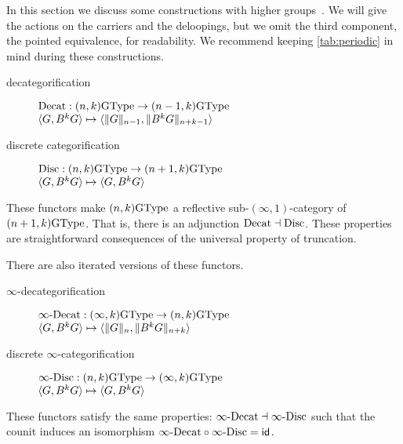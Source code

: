 In this section we discuss some constructions with higher groups~\cite{BaezDolan1998}. We will give the actions on the carriers and the deloopings, but we omit the third component, the pointed equivalence, for readability. We recommend keeping \cref{tab:periodic} in mind during these constructions.
\begin{description}
\item[decategorification] $\Decat : (n,k)\GType \to (n-1,k)\GType$\\
  $\angled{G,B^kG} \mapsto \angled{\trunc{n-1}{G}, \trunc{n+k-1}{B^kG}}$
\item[discrete categorification] $\Disc : (n,k)\GType \to (n+1,k)\GType$ \\
  $\angled{G,B^kG} \mapsto \angled{G,B^kG}$
\end{description}
These functors make $(n,k)\GType$ a reflective sub-$(\infty,1)$-category of $(n+1,k)\GType$. That is, there is an adjunction ${\Decat} \dashv {\Disc}$. These properties are straightforward consequences of the universal property of truncation.

There are also iterated versions of these functors.
\begin{description}
  \item[$\infty$-decategorification] $\iDecat : (\infty,k)\GType \to (n,k)\GType$\\
    $\angled{G,B^kG} \mapsto \angled{\trunc{n}{G}, \trunc{n+k}{B^kG}}$
  \item[discrete $\infty$-categorification] $\iDisc : (n,k)\GType \to (\infty,k)\GType$ \\
    $\angled{G,B^kG} \mapsto \angled{G,B^kG}$
\end{description}
These functors satisfy the same properties: ${\iDecat} \dashv {\iDisc}$ such that the counit induces an isomorphism ${\iDecat} \circ {\iDisc} = \idfunc$.


